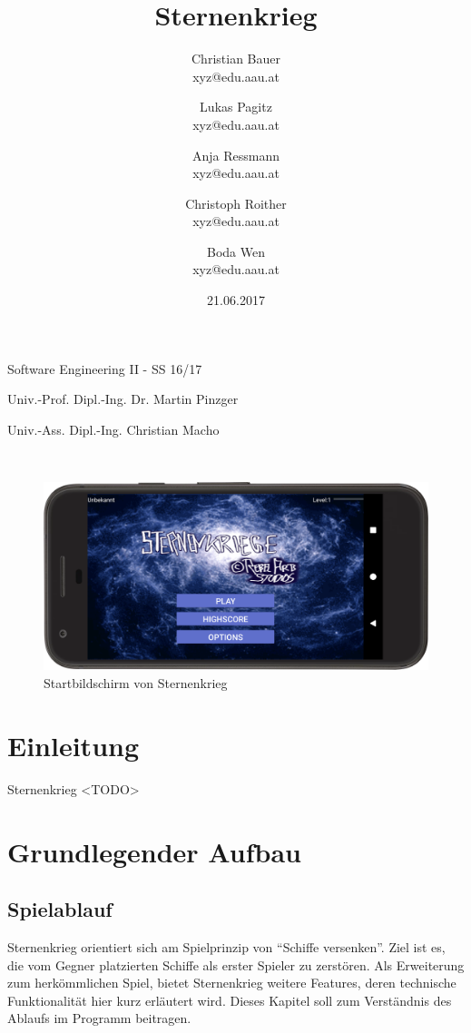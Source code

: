 \documentclass[11pt]{article} %
\title{Sternenkrieg}
\author{Christian Bauer\\ xyz@edu.aau.at
\and Lukas Pagitz \\ xyz@edu.aau.at
\and Anja Ressmann \\ xyz@edu.aau.at
\and Christoph Roither \\ xyz@edu.aau.at
\and Boda Wen \\ xyz@edu.aau.at}
\date{21.06.2017}
\begin{document}
\maketitle

\begin{center}
Software Engineering II - SS 16/17

\hfill \break

Univ.-Prof. Dipl.-Ing. Dr. Martin Pinzger

Univ.-Ass. Dipl.-Ing. Christian Macho

\hfill \break
\\[3em]
\begin{figure}[H]
	\centering
 	\includegraphics[width=1\textwidth]{img/main}
	\caption{Startbildschirm von Sternenkrieg}
\end{figure}
\end{center}
\hfill \break
\newpage
\tableofcontents

\newpage

\section{Einleitung}

Sternenkrieg <TODO>

\section{Grundlegender Aufbau}
\subsection{Spielablauf}
Sternenkrieg orientiert sich am Spielprinzip von \enquote{Schiffe versenken}. Ziel ist es, die vom Gegner platzierten Schiffe als erster Spieler zu zerstören. Als Erweiterung zum herkömmlichen Spiel, bietet Sternenkrieg weitere Features, deren technische Funktionalität hier kurz erläutert wird. Dieses Kapitel soll zum Verständnis des Ablaufs im Programm beitragen.
\end{document}

